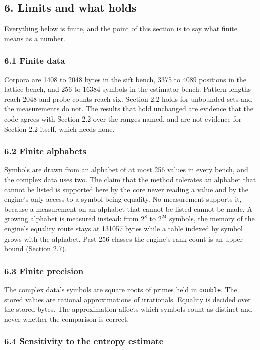 \subsection{6. Limits and what holds}

Everything below is finite, and the point of this section is to say what finite means as a number.

\subsubsection{6.1 Finite data}

Corpora are 1408 to 2048 bytes in the sift bench, 3375 to 4089 positions in the lattice bench, and 256 to 16384 symbols in the estimator bench. Pattern lengths reach 2048 and probe counts reach six. Section 2.2 holds for unbounded sets and the measurements do not. The results that hold unchanged are evidence that the code agrees with Section 2.2 over the ranges named, and are not evidence for Section 2.2 itself, which needs none.

\subsubsection{6.2 Finite alphabets}

Symbols are drawn from an alphabet of at most 256 values in every bench, and the complex data uses two. The claim that the method tolerates an alphabet that cannot be listed is supported here by the core never reading a value and by the engine's only access to a symbol being equality. No measurement supports it, because a measurement on an alphabet that cannot be listed cannot be made. A growing alphabet is measured instead: from \(2^8\) to \(2^{24}\) symbols, the memory of the engine's equality route stays at 131057 bytes while a table indexed by symbol grows with the alphabet. Past 256 classes the engine's rank count is an upper bound (Section 2.7).

\subsubsection{6.3 Finite precision}

The complex data's symbols are square roots of primes held in \texttt{double}. The stored values are rational approximations of irrationals. Equality is decided over the stored bytes. The approximation affects which symbols count as distinct and never whether the comparison is correct.

\subsubsection{6.4 Sensitivity to the entropy estimate}

